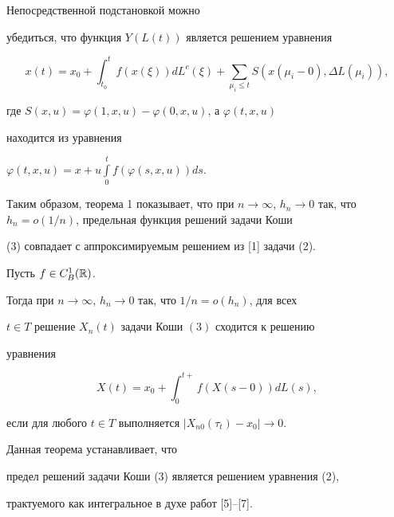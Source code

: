 \begin{note}


Непосредственной подстановкой можно


убедиться, что функция $Y(L(t))$ является решением уравнения


$$


x(t)=x_0+\int_{t_0}^{t}f(x(\xi))dL^c(\xi)+


\sum_{\mu_i\leq t}S(x(\mu_i-0),\Delta


L(\mu_i)),


$$


где $S(x,u){=}\varphi(1,x,u)-\varphi(0,x,u)$, а $\varphi(t,x,u)$


находится из уравнения


$\varphi(t,x,u){=}x{+}u\int\limits_0^tf(\varphi(s,x,u))ds$.


\end{note}





Таким образом, теорема 1 показывает, что  при $n\to\infty$, $h_n\to


0$ так, что $h_n=o(1/n)$, предельная функция решений задачи Коши


(3) совпадает с аппроксимируемым решением из [1] задачи (2).





\begin{thm}


Пусть $f\in C_B^1(\Bbb{R})$.


Тогда при $n\to\infty$, $h_n\to 0$ так, что $ 1/n =o(h_n)$, для всех


$t \in T$  решение $X_n(t)$ задачи Коши $(3)$ сходится  к решению


уравнения


\begin{equation}


X(t)=x_0+\int_0^{t+}f(X(s-0))dL(s),


\end{equation}


если для любого $ t\in T$ выполняется $|X_{n0}(\tau_t)-x_0|\to0$.


\end{thm}





\begin{note}


Данная теорема устанавливает, что


предел решений задачи Коши (3) является решением уравнения (2),


трактуемого как интегральное в духе работ [5]--[7].


\end{note}





